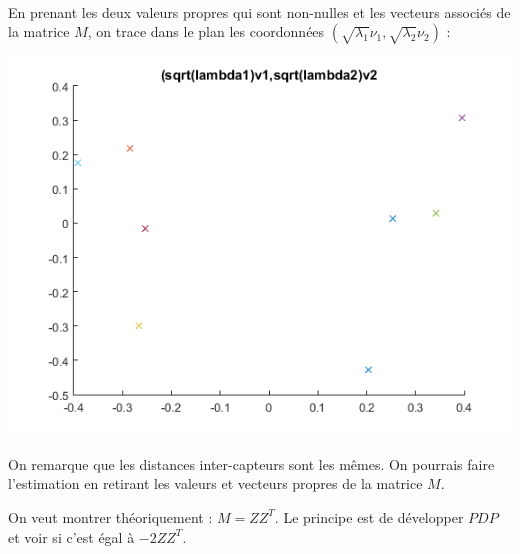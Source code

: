 \documentclass{article}
\begin{document}
\\En prenant les deux valeurs propres qui sont non-nulles et les vecteurs associ\'es de la matrice $M$, on trace dans le plan les coordonn\'ees $(\sqrt{\lambda_{1}}\nu_{1},\sqrt{\lambda_{2}}\nu_{2})$ :
\begin{center}
\includegraphics[scale=0.5]{sans_ancres2.png}
\end{center}
On remarque que les distances inter-capteurs sont les m\^emes. On pourrais faire l'estimation en retirant les valeurs et vecteurs propres de la matrice $M$.

On veut montrer th\'eoriquement : $M = ZZ^{T}$. Le principe est de d\'evelopper $PDP$ et voir si c'est \'egal \`a $-2ZZ^{T}$.
\end{document}
